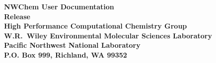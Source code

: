 %
%

\begin{titlepage}

\begin{centering}


{\bf\Huge NWChem User Documentation}\\[0.5in] 
{\bf\Huge Release \nwchemversion}\\[1.0in]

{\bf\Large High Performance Computational Chemistry Group\\
    W.R.\ Wiley Environmental Molecular Sciences Laboratory\\
    Pacific Northwest National Laboratory\\
    P.O. Box 999, Richland, WA 99352\\[0.5in]}

{\bf\Large \nwchemmonth \ \nwchemyear}\\[1.0in]




\end{centering}

\end{titlepage}
